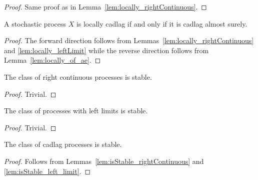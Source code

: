 \begin{proof}
  \leanok
  Same proof as in Lemma~\ref{lem:locally_rightContinuous}.
\end{proof}

\begin{lemma}\label{lem:locally_isCadlag}
  \leanok
  A stochastic process $X$ is locally cadlag if and only if it is cadlag almost surely.
\end{lemma}

\begin{proof}\leanok
  The forward direction follows from Lemmas~\ref{lem:locally_rightContinuous} and \ref{lem:locally_leftLimit}
  while the reverse direction follows from Lemma~\ref{lem:locally_of_ae}.
\end{proof}

\begin{lemma}\label{lem:isStable_rightContinuous}
  \leanok
  The class of right continuous processes is stable.
\end{lemma}

\begin{proof}\leanok
  Trivial.
\end{proof}

\begin{lemma}\label{lem:isStable_left_limit}
  \leanok
  The class of processes with left limits is stable.
\end{lemma}

\begin{proof}\leanok
  Trivial.
\end{proof}

\begin{lemma}\label{lem:isStable_isCadlag}
  \leanok
  The class of cadlag processes is stable.
\end{lemma}

\begin{proof}
  \leanok
  Follows from Lemmas~\ref{lem:isStable_rightContinuous} and \ref{lem:isStable_left_limit}.
\end{proof}


